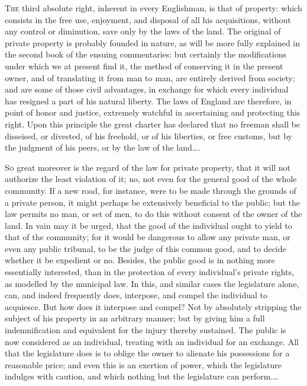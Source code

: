 
\textsc{The}
third absolute right, inherent in every Englishman, is that of property:
which consists in the free use, enjoyment, and disposal of all his
acquisitions, without any control or diminution, save only by the laws of the
land. The original of private property is probably founded in nature, as will
be more fully explained in the second book of the ensuing commentaries: but
certainly the modifications under which we at present find it, the method of
conserving it in the present owner, and of translating it from man to man, are
entirely derived from society; and are some of those civil advantages, in
exchange for which every individual has resigned a part of his natural liberty.
The laws of England are therefore, in point of honor and justice, extremely
watchful in ascertaining and protecting this right. Upon this principle the
great charter has declared that no freeman shall be disseised, or divested, of
his freehold, or of his liberties, or free customs, but by the judgment of his
peers, or by the law of the land\ldots.


\textsc{So}
great moreover is the regard of the law for private property, that it will
not authorize the least violation of it; no, not even for the general good of
the whole community. If a new road, for instance, were to be made through the
grounds of a private person, it might perhaps be extensively beneficial to the
public; but the law permits no man, or set of men, to do this without consent
of the owner of the land. In vain may it be urged, that the good of the
individual ought to yield to that of the community; for it would be dangerous
to allow any private man, or even any public tribunal, to be the judge of this
common good, and to decide whether it be expedient or no. Besides, the public
good is in nothing more essentially interested, than in the protection of every
individual's private rights, as modelled by the municipal law. In this, and
similar cases the legislature alone, can, and indeed frequently does,
interpose, and compel the individual to acquiesce. But how does it interpose
and compel? Not by absolutely stripping the subject of his property in an
arbitrary manner; but by giving him a full indemnification and equivalent for
the injury thereby sustained. The public is now considered as an individual,
treating with an individual for an exchange. All that the legislature does is
to oblige the owner to alienate his possessions for a reasonable price; and
even this is an exertion of power, which the legislature indulges with caution,
and which nothing but the legislature can perform.\ldots


